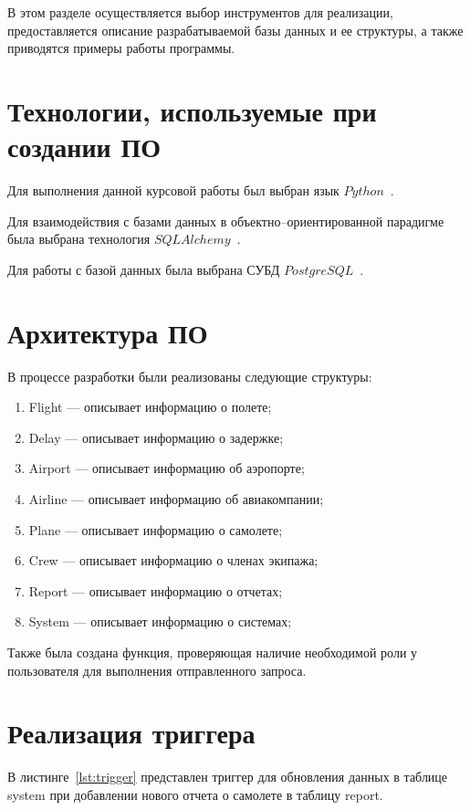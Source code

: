 В этом разделе осуществляется выбор инструментов для реализации, предоставляется описание разрабатываемой базы данных и ее структуры, а также приводятся примеры работы программы.

\section{Технологии, используемые при \newline создании ПО}

Для выполнения данной курсовой работы был выбран язык \newline $Python$~\cite{python-lang}.

Для взаимодействия с базами данных в объектно--ориентированной парадигме была выбрана технология $SQLAlchemy$~\cite{sqlalchemy}.

Для работы с базой данных была выбрана СУБД $PostgreSQL$~\cite{postgresql}.

\section{Архитектура ПО}

В процессе разработки были реализованы следующие структуры:
\begin{enumerate}[label=\arabic*)]
    \item Flight --- описывает информацию о полете;
    \item Delay --- описывает информацию о задержке;
    \item Airport --- описывает информацию об аэропорте;
    \item Airline --- описывает информацию об авиакомпании;
    \item Plane --- описывает информацию о самолете;
    \item Crew --- описывает информацию о членах экипажа;
    \item Report --- описывает информацию о отчетах;
    \item System --- описывает информацию о системах;
\end{enumerate}

Также была создана функция, проверяющая наличие необходимой роли у пользователя для выполнения отправленного запроса.

\section{Реализация триггера}

В листинге~\ref{lst:trigger} представлен триггер для обновления данных в таблице system при добавлении нового отчета о самолете в таблицу report.

